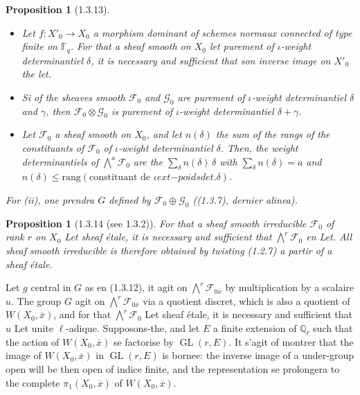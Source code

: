 \documentclass[12pt,a4paper]{article}
\theoremstyle{plain}
\newtheorem{proposition}[theorem]{Proposition}
\theoremstyle{definition}
\theoremstyle{definition}
\theoremstyle{remark}
\DeclareMathOperator{\GL}{GL}
\begin{document}
\begin{proposition}[1.3.13]
$\;$
\begin{itemize}[nosep]
\item[(i)] Let $f: X'_0 \to X_0$ a morphism dominant of schemes normaux connected of type finite on $\mathbb{F}_q$. For that a sheaf smooth on $X_0$ let purement of $\iota$-weight determinantiel $\delta$, it is necessary and sufficient that son inverse image on $X'_0$ the let.
\item[(ii)] Si of the sheaves smooth $\mathscr{F}_0$ and $\mathscr{G}_0$ are purement of $\iota$-weight determinantiel $\delta$ and $\gamma$, then $\mathscr{F}_0 \otimes \mathscr{G}_0$ is purement of $\iota$-weight determinantiel $\delta + \gamma$.
\item[(iii)] Let $\mathscr{F}_0$ a sheaf smooth on $X_0$, and let $n(\delta)$ the sum of the rangs of the constituants of $\mathscr{F}_0$ of $\iota$-weight determinantiel $\delta$. Then, the weight determinantiels of $\bigwedge^a \mathscr{F}_0$ are the $\sum_\delta n(\delta)\,\delta$ with $\sum_\delta n(\delta) = a$ and $n(\delta) \leq \text{rang}(\text{constituant de } \iota	ext{-poids det. } \delta)$.
\end{itemize}
For (ii), one prendra $G$ defined by $\mathscr{F}_0 \oplus \mathscr{G}_0$ ((1.3.7), dernier alinea).
\end{proposition}

\begin{proposition}[1.3.14 (see 1.3.2)]
For that a sheaf smooth irreducible $\mathscr{F}_0$ of rank $r$ on $X_0$ Let sheaf étale, it is necessary and sufficient that $\bigwedge^r \mathscr{F}_0$ en Let. All sheaf smooth irreducible is therefore obtained by twisting (1.2.7) a partir of a sheaf étale.
\end{proposition}

Let $g$ central in $G$ as en (1.3.12), it agit on $\bigwedge^r \mathscr{F}_{0\overline{x}}$ by multiplication by a scalaire $u$. The group $G$ agit on $\bigwedge^r \mathscr{F}_{0\overline{x}}$ via a quotient discret, which is also a quotient of $W(X_0, \overline{x})$, and for that $\bigwedge^r \mathscr{F}_0$ Let sheaf étale, it is necessary and sufficient that $u$ Let unite $\ell$-adique. Supposons-the, and let $E$ a finite extension of $\mathbb{Q}_\ell$ such that the action of $W(X_0, \overline{x})$ se factorise by $\GL(r, E)$. It s'agit of montrer that the image of $W(X_0, \overline{x})$ in $\GL(r, E)$ is bornee: the inverse image of a under-group open will be then open of indice finite, and the representation se prolongera to the complete $\pi_1(X_0, \overline{x})$ of $W(X_0, \overline{x})$.
\end{document}
